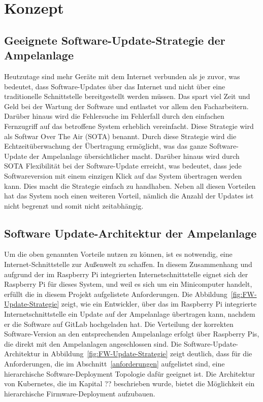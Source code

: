 \section{Konzept}


\subsection{Geeignete Software-Update-Strategie der Ampelanlage}

Heutzutage sind mehr Geräte mit dem Internet verbunden als je zuvor, was bedeutet, dass Software-Updates über das Internet und nicht über eine traditionelle Schnittstelle bereitgestellt werden müssen. Das spart viel Zeit und Geld bei der Wartung der Software und entlastet vor allem den Facharbeitern. Darüber hinaus wird die Fehlersuche im Fehlerfall durch den einfachen Fernzugriff auf das betroffene System erheblich vereinfacht. 
Diese Strategie wird als Softwar Over The Air (SOTA) benannt. Durch diese Strategie wird die Echtzeitüberwachung der Übertragung ermöglicht, was das ganze Software-Update der Ampelanlage übersichtlicher macht. Darüber hinaus wird durch SOTA Flexibilität bei der Software-Update erreicht, was bedeutet, dass jede Softwareversion mit einem einzigen Klick auf das System übertragen werden kann.
Dies macht die Strategie einfach zu handhaben. Neben all diesen Vorteilen hat das System noch einen weiteren Vorteil, nämlich die Anzahl der Updates ist nicht begrenzt und somit nicht zeitabhängig.


\subsection{Software Update-Architektur der Ampelanlage}

Um die oben genannten Vorteile nutzen zu können, ist es notwendig, eine Internet-Schnittstelle zur Außenwelt zu schaffen. In diesem Zusammenhang und aufgrund der im Raspberry Pi integrierten Internetschnittstelle eignet sich der Raspberry Pi für dieses System,  und weil es sich um ein Minicomputer handelt, erfüllt die in diesem Projekt aufgelistete Anforderungen. Die Abbildung~\ref{fig:FW-Update-Strategie} zeigt, wie ein Entwickler, über das im Raspberry Pi integrierte Internetschnittstelle ein Update auf der Ampelanlage übertragen kann, nachdem er die Software auf GitLab hochgeladen hat. Die Verteilung der korrekten Software-Version an den entsprechenden Ampelanlage erfolgt über Raspberry Pis, die direkt mit den Ampelanlagen angeschlossen sind.
\newline\newline
Die Software-Update-Architektur in Abbildung~\ref{fig:FW-Update-Strategie} zeigt deutlich, dass für die Anforderungen, die im Abschnitt~\ref{anforderungen} aufgelistet sind, eine hierarchische Software-Deployment Topologie dafür geeignet ist. 
\newline\newline
Die Architektur von Kubernetes, die im Kapital {\LARGE ??} beschrieben wurde, bietet die Möglichkeit ein hierarchische Firmware-Deployment aufzubauen.


